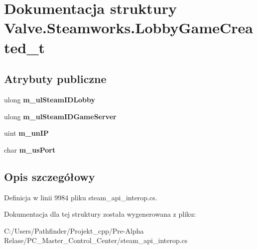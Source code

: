 \hypertarget{struct_valve_1_1_steamworks_1_1_lobby_game_created__t}{}\section{Dokumentacja struktury Valve.\+Steamworks.\+Lobby\+Game\+Created\+\_\+t}
\label{struct_valve_1_1_steamworks_1_1_lobby_game_created__t}
\subsection*{Atrybuty publiczne}
\begin{DoxyCompactItemize}
\item 
\mbox{\label{struct_valve_1_1_steamworks_1_1_lobby_game_created__t_aeb16d12746a47be408032bcc8a2821dd}} 
ulong {\bfseries m\+\_\+ul\+Steam\+I\+D\+Lobby}
\item 
\mbox{\label{struct_valve_1_1_steamworks_1_1_lobby_game_created__t_a9ac74e23cae5ce48fbe6cb49c7f44f3f}} 
ulong {\bfseries m\+\_\+ul\+Steam\+I\+D\+Game\+Server}
\item 
\mbox{\label{struct_valve_1_1_steamworks_1_1_lobby_game_created__t_a0f4d6618503ccad814de26c4d160865c}} 
uint {\bfseries m\+\_\+un\+IP}
\item 
\mbox{\label{struct_valve_1_1_steamworks_1_1_lobby_game_created__t_a0135e5207d6e037a81ec1413bcd3c200}} 
char {\bfseries m\+\_\+us\+Port}
\end{DoxyCompactItemize}


\subsection{Opis szczegółowy}


Definicja w linii 9984 pliku steam\+\_\+api\+\_\+interop.\+cs.



Dokumentacja dla tej struktury została wygenerowana z pliku\+:\begin{DoxyCompactItemize}
\item 
C\+:/\+Users/\+Pathfinder/\+Projekt\+\_\+cpp/\+Pre-\/\+Alpha Relase/\+P\+C\+\_\+\+Master\+\_\+\+Control\+\_\+\+Center/steam\+\_\+api\+\_\+interop.\+cs\end{DoxyCompactItemize}
